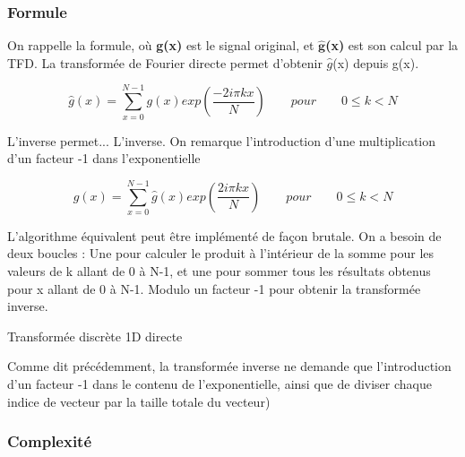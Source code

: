 \documentclass{article}
\begin{document}
\subsubsection{Formule}
On rappelle la formule, où \textbf{g(x)} est le signal original, et \textbf{$\widehat{\textbf{g}}$(x)} est son calcul par la TFD. La transformée de Fourier directe permet d'obtenir $\widehat{g}$(x) depuis g(x).

\begin{equation}
		\widehat{g}(x) = \sum_{x = 0}^{N-1}g(x) exp(\frac{-2i\pi kx}{N}) \qquad pour \qquad 0 \leq k < N
\end{equation}

\noindent L'inverse permet... L'inverse. On remarque l'introduction d'une multiplication d'un facteur -1 dans l'exponentielle

\begin{equation}
	g(x) = \sum_{x = 0}^{N-1}\widehat{g}(x) exp(\frac{2i\pi kx}{N}) \qquad pour \qquad 0 \leq k < N
\end{equation}


\noindent L'algorithme équivalent peut être implémenté de façon brutale. On a besoin de deux boucles : Une pour calculer le produit à l'intérieur de la somme pour les valeurs de k allant de 0 à N-1, et une pour sommer tous les résultats obtenus pour x allant de 0 à N-1. Modulo un facteur -1 pour obtenir la transformée inverse.


\begin{algorithm}
	\caption{Transformée discrète 1D directe}\label{alg:cap}
\end{algorithm}

Comme dit précédemment, la transformée inverse ne demande que l'introduction d'un facteur -1 dans le contenu de l'exponentielle, ainsi que de diviser chaque indice de vecteur par la taille totale du vecteur)

\subsubsection{Complexité}
\end{document}
